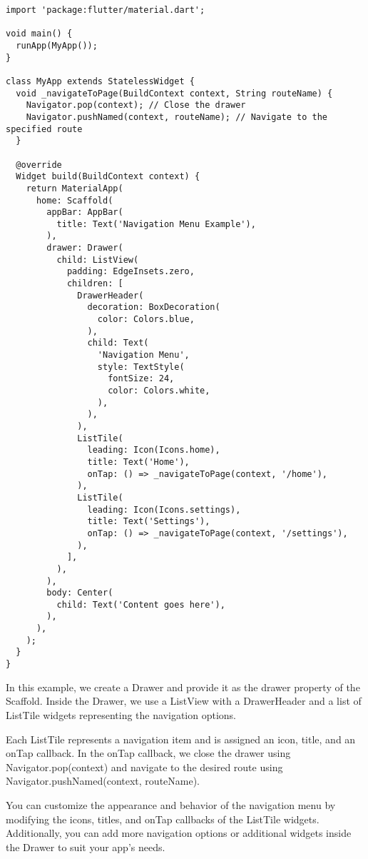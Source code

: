 \begin{lstlisting}
import 'package:flutter/material.dart';

void main() {
  runApp(MyApp());
}

class MyApp extends StatelessWidget {
  void _navigateToPage(BuildContext context, String routeName) {
    Navigator.pop(context); // Close the drawer
    Navigator.pushNamed(context, routeName); // Navigate to the specified route
  }

  @override
  Widget build(BuildContext context) {
    return MaterialApp(
      home: Scaffold(
        appBar: AppBar(
          title: Text('Navigation Menu Example'),
        ),
        drawer: Drawer(
          child: ListView(
            padding: EdgeInsets.zero,
            children: [
              DrawerHeader(
                decoration: BoxDecoration(
                  color: Colors.blue,
                ),
                child: Text(
                  'Navigation Menu',
                  style: TextStyle(
                    fontSize: 24,
                    color: Colors.white,
                  ),
                ),
              ),
              ListTile(
                leading: Icon(Icons.home),
                title: Text('Home'),
                onTap: () => _navigateToPage(context, '/home'),
              ),
              ListTile(
                leading: Icon(Icons.settings),
                title: Text('Settings'),
                onTap: () => _navigateToPage(context, '/settings'),
              ),
            ],
          ),
        ),
        body: Center(
          child: Text('Content goes here'),
        ),
      ),
    );
  }
}
\end{lstlisting}

In this example, we create a Drawer and provide it as the drawer property of the Scaffold. Inside the Drawer, we use 
a ListView with a DrawerHeader and a list of ListTile widgets representing the navigation options.

Each ListTile represents a navigation item and is assigned an icon, title, and an onTap callback. In the onTap 
callback, we close the drawer using Navigator.pop(context) and navigate to the desired route using 
Navigator.pushNamed(context, routeName).

You can customize the appearance and behavior of the navigation menu by modifying the icons, titles, and onTap 
callbacks of the ListTile widgets. Additionally, you can add more navigation options or additional widgets inside 
the Drawer to suit your app's needs.

